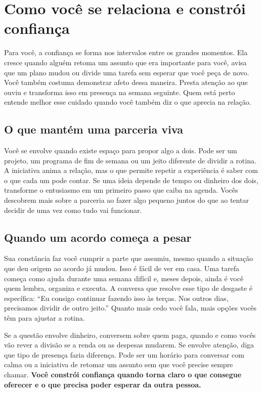\clearpage
\section*{Como você se relaciona e constrói confiança}

Para você, a confiança se forma nos intervalos entre os grandes momentos. Ela cresce quando alguém retoma um assunto que era importante para você, avisa que um plano mudou ou divide uma tarefa sem esperar que você peça de novo. Você também costuma demonstrar afeto dessa maneira. Presta atenção ao que ouviu e transforma isso em presença na semana seguinte. Quem está perto entende melhor esse cuidado quando você também diz o que aprecia na relação.

\subsection*{O que mantém uma parceria viva}

Você se envolve quando existe espaço para propor algo a dois. Pode ser um projeto, um programa de fim de semana ou um jeito diferente de dividir a rotina. A iniciativa anima a relação, mas o que permite repetir a experiência é saber com o que cada um pode contar. Se uma ideia depende de tempo ou dinheiro dos dois, transforme o entusiasmo em um primeiro passo que caiba na agenda. Vocês descobrem mais sobre a parceria ao fazer algo pequeno juntos do que ao tentar decidir de uma vez como tudo vai funcionar.

\subsection*{Quando um acordo começa a pesar}

Sua constância faz você cumprir a parte que assumiu, mesmo quando a situação que deu origem ao acordo já mudou. Isso é fácil de ver em casa. Uma tarefa começa como ajuda durante uma semana difícil e, meses depois, ainda é você quem lembra, organiza e executa. A conversa que resolve esse tipo de desgaste é específica: “Eu consigo continuar fazendo isso às terças. Nos outros dias, precisamos dividir de outro jeito.” Quanto mais cedo você fala, mais opções vocês têm para ajustar a rotina.

Se a questão envolve dinheiro, conversem sobre quem paga, quando e como vocês vão rever a divisão se a renda ou as despesas mudarem. Se envolve atenção, diga que tipo de presença faria diferença. Pode ser um horário para conversar com calma ou a iniciativa de retomar um assunto sem que você precise sempre chamar. \textbf{Você constrói confiança quando torna claro o que consegue oferecer e o que precisa poder esperar da outra pessoa.}

